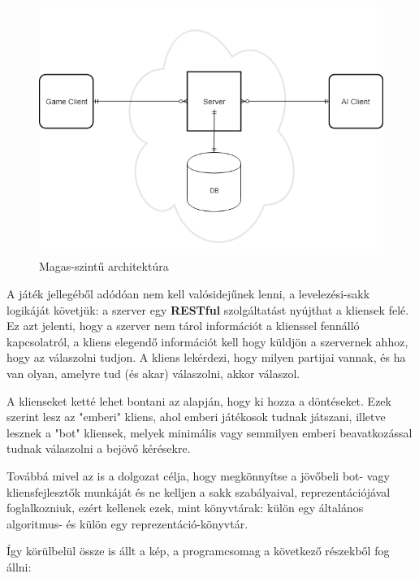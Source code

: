 \documentclass[twoside, a4paper, 12pt]{article}
\begin{document}
\begin{figure}[htbp]
	\centering
	\includegraphics[width=1.0\textwidth]{img/highLevelArchitecture.png}
	\caption{Magas-szintű architektúra}
	\label{fig:highLevelArchitecture}
\end{figure}

A játék jellegéből adódóan nem kell valósidejűnek lenni, a levelezési-sakk logikáját követjük: a szerver egy \textbf{RESTful} szolgáltatást nyújthat a kliensek felé. Ez azt jelenti, hogy a szerver nem tárol információt a klienssel fennálló kapcsolatról, a kliens elegendő információt kell hogy küldjön a szervernek ahhoz, hogy az válaszolni tudjon. A kliens lekérdezi, hogy milyen partijai vannak, és ha van olyan, amelyre tud (és akar) válaszolni, akkor válaszol.

A klienseket ketté lehet bontani az alapján, hogy ki hozza a döntéseket. Ezek szerint lesz az "emberi" kliens, ahol emberi játékosok tudnak játszani, illetve lesznek a "bot" kliensek, melyek minimális vagy semmilyen emberi beavatkozással tudnak válaszolni a bejövő kérésekre.

Továbbá mivel az is a dolgozat célja, hogy megkönnyítse a jövőbeli bot- vagy kliensfejlesztők munkáját és ne kelljen a sakk szabályaival, reprezentációjával foglalkozniuk, ezért kellenek ezek, mint könyvtárak: külön egy általános algoritmus- és külön egy reprezentáció-könyvtár.

Így körülbelül össze is állt a kép, a programcsomag a következő részekből fog állni:
\end{document}
